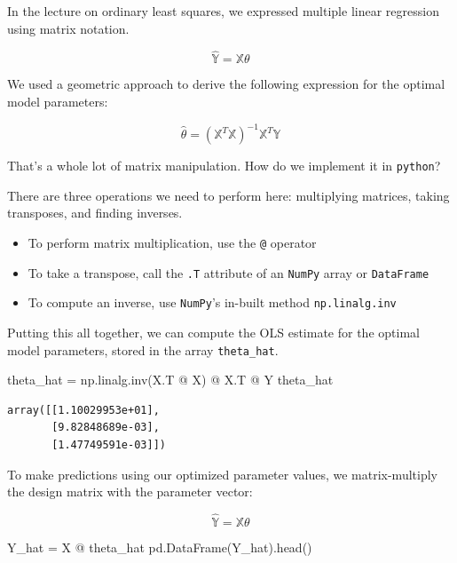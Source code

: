 \documentclass[
  letterpaper,
  DIV=11,
  numbers=noendperiod]{scrreprt}
\newenvironment{Shaded}{\begin{snugshade}}{\end{snugshade}}
\newcommand{\NormalTok}[1]{\textcolor[rgb]{0.00,0.23,0.31}{#1}}
\newcommand{\OperatorTok}[1]{\textcolor[rgb]{0.37,0.37,0.37}{#1}}
\providecommand{\tightlist}{%
  \setlength{\itemsep}{0pt}\setlength{\parskip}{0pt}}\usepackage{longtable,booktabs,array}
\begin{document}
In the lecture on ordinary least squares, we expressed multiple linear
regression using matrix notation.

\[\hat{\mathbb{Y}} = \mathbb{X}\theta\]

We used a geometric approach to derive the following expression for the
optimal model parameters:

\[\hat{\theta} = (\mathbb{X}^T \mathbb{X})^{-1}\mathbb{X}^T \mathbb{Y}\]

That's a whole lot of matrix manipulation. How do we implement it in
\texttt{python}?

There are three operations we need to perform here: multiplying
matrices, taking transposes, and finding inverses.

\begin{itemize}
\tightlist
\item
  To perform matrix multiplication, use the \texttt{@} operator
\item
  To take a transpose, call the \texttt{.T} attribute of an
  \texttt{NumPy} array or \texttt{DataFrame}
\item
  To compute an inverse, use \texttt{NumPy}'s in-built method
  \texttt{np.linalg.inv}
\end{itemize}

Putting this all together, we can compute the OLS estimate for the
optimal model parameters, stored in the array \texttt{theta\_hat}.

\begin{Shaded}
\begin{Highlighting}[]
\NormalTok{theta\_hat }\OperatorTok{=}\NormalTok{ np.linalg.inv(X.T }\OperatorTok{@}\NormalTok{ X) }\OperatorTok{@}\NormalTok{ X.T }\OperatorTok{@}\NormalTok{ Y}
\NormalTok{theta\_hat}
\end{Highlighting}
\end{Shaded}

\begin{verbatim}
array([[1.10029953e+01],
       [9.82848689e-03],
       [1.47749591e-03]])
\end{verbatim}

To make predictions using our optimized parameter values, we
matrix-multiply the design matrix with the parameter vector:

\[\hat{\mathbb{Y}} = \mathbb{X}\theta\]

\begin{Shaded}
\begin{Highlighting}[]
\NormalTok{Y\_hat }\OperatorTok{=}\NormalTok{ X }\OperatorTok{@}\NormalTok{ theta\_hat}
\NormalTok{pd.DataFrame(Y\_hat).head()}
\end{Highlighting}
\end{Shaded}
\end{document}
